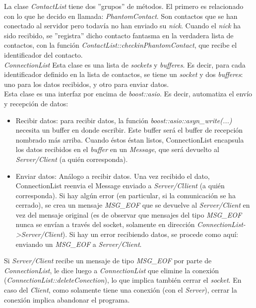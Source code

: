 \documentclass[a4paper,11pt,titlepage,halfparskip,cleardoubleempty]{scrbook}
\begin{document}
   La clase \textit{ContactList} tiene dos ''grupos'' de métodos. El primero es relacionado con lo
   que he decido en llamada: \textit{PhantomContact}. Son contactos que se han conectado al
   servidor pero todavía no han enviado su \textit{nick}. Cuando el \textit{nick} ha sido recibido,
   se ''registra'' dicho contacto fantasma en la verdadera lista de contactos, con la
   función \textit{ContactList::checkinPhantomContact}, que recibe el identificador del contacto.
\\
   \textit{ConnectionList}
   Esta clase es una lista de \textit{sockets} y \textit{bufferes}. Es decir, para cada identificador
   definido en la lista de contactos, se tiene un \textit{socket} y dos \textit{bufferes}: uno para
   los datos recibidos, y otro para enviar datos.\\

   Esta clase es una interfaz por encima de \textit{boost::asio}. Es decir, automatiza el
   envío y recepción de datos:
\begin{itemize}
\item Recibir datos: para recibir datos, la función \textit{boost::asio::asyn\_write(...)}
                     necesita un buffer en donde escribir. Este buffer será el
                     buffer de recepción nombrado más arriba. Cuando éstos
                     éstan listos, ConnectionList encapsula los datos recibidos en
                     el \textit{buffer} en un \textit{Message}, que será devuelto al \textit{Server/Client} (a quién corresponda).
\item Enviar datos: Análogo a recibir datos. Una vez recibido el dato, ConnectionList
                    reenvia el Message enviado a \textit{Server/Cllient} (a quién corresponda).
                    Si hay algún error (en particular, si la comunicación se ha cerrado),
                    se crea un mensaje \textit{MSG\_EOF} que se devuelve al \textit{Server/Client} en vez
                    del mensaje original (es de observar que mensajes del tipo \textit{MSG\_EOF}
                    nunca se envían a través del socket, solamente en dirección
                    \textit{ConnectionList->Server/Client}). Si hay un error recibiendo datos,
                    se procede como aquí: enviando un \textit{MSG\_EOF} a \textit{Server/Client}.
\end{itemize}
   Si \textit{Server/Client} recibe un mensaje de tipo \textit{MSG\_EOF} por parte de \textit{ConnectionList},
   le dice luego a \textit{ConnectionList} que elimine la conexión (\textit{ConnectionList::deleteConection}),
   lo que implica también cerrar el \textit{socket}. En caso del \textit{Client}, como solamente tiene
   una conexión (con el \textit{Server}), cerrar la conexión implica abandonar el programa.\\
\end{document}
